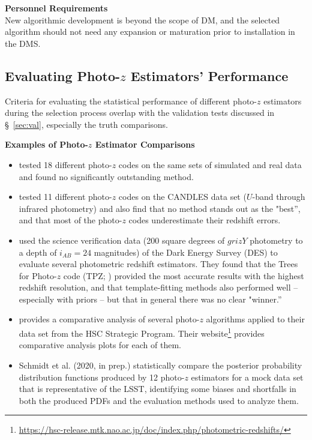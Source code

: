 \documentclass[DM,lsstdraft,toc]{lsstdoc}
\begin{document}
{\bf Personnel Requirements}\\
New algorithmic development is beyond the scope of DM, and the selected algorithm should not need any expansion or maturation prior to installation in the DMS.


\subsection{Evaluating Photo-$z$ Estimators' Performance}\label{ssec:sel_eval}

Criteria for evaluating the statistical performance of different photo-$z$ estimators during the selection process overlap with the validation tests discussed in \S~\ref{sec:val}, especially the truth comparisons.

\textbf{Examples of Photo-$z$ Estimator Comparisons}
\vspace{-15pt}
\begin{itemize}
\item \citet{2010A&A...523A..31H} tested 18 different photo-$z$ codes on the same sets of simulated and real data and found no significantly outstanding method.
\item \citet{2013ApJ...775...93D} tested 11 different photo-$z$ codes on the CANDLES data set ($U$-band through infrared photometry) and also find that no method stands out as the "best'', and that most of the photo-$z$ codes underestimate their redshift errors.
\item \citet{2014MNRAS.445.1482S} used the science verification data (200 square degrees of $grizY$ photometry to a depth of $i_{AB}=24$ magnitudes) of the Dark Energy Survey (DES) to evaluate several photometric redshift estimators. They found that the Trees for Photo-$z$ code (TPZ; \citet{2013ascl.soft04011C}) provided the most accurate results with the highest redshift resolution, and that template-fitting methods also performed well -- especially with priors -- but that in general there was no clear "winner.''
\item \citet{2018PASJ...70S...9T} provides a comparative analysis of several photo-$z$ algorithms applied to their data set from the HSC Strategic Program. Their website\footnote{\url{https://hsc-release.mtk.nao.ac.jp/doc/index.php/photometric-redshifts/}} provides comparative analysis plots for each of them.
\item Schmidt et al. (2020, in prep.) statistically compare the posterior probability distribution functions produced by 12 photo-$z$ estimators for a mock data set that is representative of the LSST, identifying some biases and shortfalls in both the produced PDFs and the evaluation methods used to analyze them.
\end{itemize}
\end{document}
